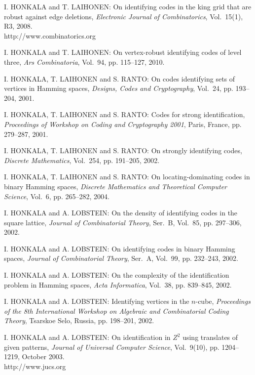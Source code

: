 \begin{thebibliography}{999}
I. HONKALA and T. LAIHONEN: On identifying codes in the king grid that are robust against edge deletions, {\it Electronic Journal of Combinatorics}, Vol.~15(1), R3, 2008.\\
http://www.combinatorics.org

I. HONKALA and T. LAIHONEN: On vertex-robust identifying codes of level three, {\it Ars Combinatoria}, Vol.~94, pp. 115--127, 2010.

I. HONKALA, T. LAIHONEN and S. RANTO: On codes identifying sets of vertices in Hamming spaces, {\it Designs, Codes and Cryptography}, Vol.~24, pp. 193--204, 2001.

I. HONKALA, T. LAIHONEN and S. RANTO: Codes for strong identification, {\it Proceedings of Workshop on Coding and Cryptography 2001}, Paris, France, pp. 279--287, 2001.

I. HONKALA, T. LAIHONEN and S. RANTO: On strongly identifying codes, {\it Discrete Mathematics}, Vol.~254, pp. 191--205, 2002. 

I. HONKALA, T. LAIHONEN and S. RANTO: On locating-dominating codes in binary Hamming spaces, {\it Discrete Mathematics and Theoretical Computer Science}, Vol.~6, pp. 265--282, 2004.

I. HONKALA and A. LOBSTEIN: On the density of identifying codes in the square lattice, {\it Journal of Combinatorial Theory}, Ser.~B, Vol.~85, pp. 297--306, 2002.

I. HONKALA and A. LOBSTEIN: On identifying codes in binary Hamming spaces, {\it Journal of Combinatorial Theory}, Ser.~A, Vol.~99, pp. 232--243, 2002.

I. HONKALA and A. LOBSTEIN: On the complexity of the identification problem in Hamming spaces, {\it Acta Informatica}, Vol.~38, pp. 839--845, 2002.

I. HONKALA and A. LOBSTEIN: Identifying vertices in the $n$-cube, {\it Proceedings of the 8th International Workshop on Algebraic and Combinatorial Coding Theory}, Tsarskoe Selo, Russia, pp. 198--201, 2002.

I. HONKALA and A. LOBSTEIN: On identification in $Z^2$ using translates of given patterns, {\it Journal of Universal Computer Science}, Vol.~9(10), pp. 1204--1219, October 2003.\\
http://www.jucs.org


\end{thebibliography}
